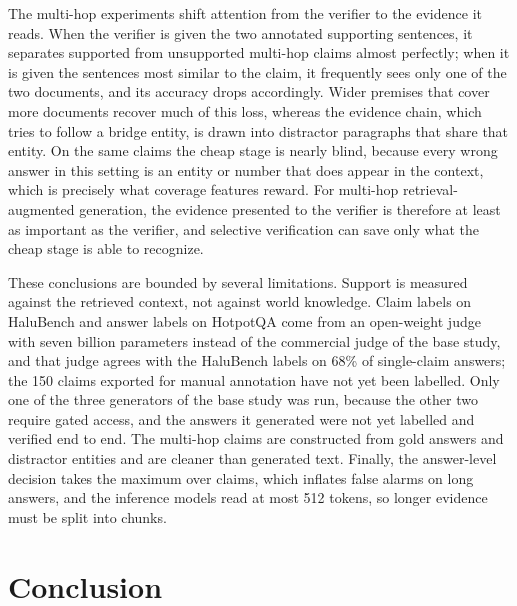 \documentclass[conference]{IEEEtran}
\begin{document}
The multi-hop experiments shift attention from the verifier to the evidence it reads. When the verifier is given the two annotated supporting sentences, it separates supported from unsupported multi-hop claims almost perfectly; when it is given the sentences most similar to the claim, it frequently sees only one of the two documents, and its accuracy drops accordingly. Wider premises that cover more documents recover much of this loss, whereas the evidence chain, which tries to follow a bridge entity, is drawn into distractor paragraphs that share that entity. On the same claims the cheap stage is nearly blind, because every wrong answer in this setting is an entity or number that does appear in the context, which is precisely what coverage features reward. For multi-hop retrieval-augmented generation, the evidence presented to the verifier is therefore at least as important as the verifier, and selective verification can save only what the cheap stage is able to recognize.

These conclusions are bounded by several limitations. Support is measured against the retrieved context, not against world knowledge. Claim labels on HaluBench and answer labels on HotpotQA come from an open-weight judge with seven billion parameters instead of the commercial judge of the base study, and that judge agrees with the HaluBench labels on 68\% of single-claim answers; the 150 claims exported for manual annotation have not yet been labelled. Only one of the three generators of the base study was run, because the other two require gated access, and the answers it generated were not yet labelled and verified end to end. The multi-hop claims are constructed from gold answers and distractor entities and are cleaner than generated text. Finally, the answer-level decision takes the maximum over claims, which inflates false alarms on long answers, and the inference models read at most 512 tokens, so longer evidence must be split into chunks.

\section{Conclusion}
\end{document}
